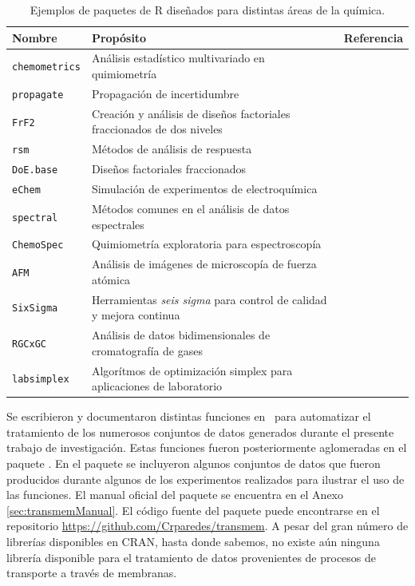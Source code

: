 \begin{table}[H]
    \centering\footnotesize
    \begin{tabular}{@{}lp{9.55cm}l@{}}\toprule
        \textbf{Nombre} & \textbf{Propósito} & \textbf{Referencia} \\\midrule
         \verb|chemometrics|&Análisis estadístico multivariado en quimiometría &\citet{Filzmoser2017}\\
         \verb|propagate|&Propagación de incertidumbre &\citet{Spiess2018}\\
         \verb|FrF2|&Creación y análisis de diseños factoriales fraccionados de dos niveles &\citet{FrF2}\\
         \verb|rsm|&Métodos de análisis de respuesta& \cite{Lenth2009}\\
         \verb|DoE.base|&Diseños factoriales fraccionados &\citet{Gromping2018}\\
         \verb|eChem|&Simulación de experimentos de electroquímica &\citet{Harvey2015}\\
         \verb|spectral|&Métodos comunes en el análisis de datos espectrales &\citet{SeilMayer2019}\\
         \verb|ChemoSpec|&Quimiometría exploratoria para espectroscopía &\citet{Hanson2020}\\
         \verb|AFM|&Análisis de imágenes de microscopía de fuerza atómica &\citet{Beauvais2019}\\
         \verb|SixSigma|&Herramientas \textit{seis sigma} para control de calidad y mejora continua &\citet{Cano2015}\\
         \verb|RGCxGC|&Análisis de datos bidimensionales de cromatografía de gases&\cite{Quiroz2020}\\
         \verb|labsimplex|&Algorítmos de optimización simplex para aplicaciones de laboratorio&\citet{labsimplex}\\\bottomrule
    \end{tabular}
    \caption{Ejemplos de paquetes de R diseñados para distintas áreas de la química.}
    \label{tab:Rpackages}
\end{table}

Se escribieron y documentaron distintas funciones en \R\ para automatizar el tratamiento de los numerosos conjuntos de datos generados durante el presente trabajo de investigación. Estas funciones fueron posteriormente aglomeradas en el paquete \trm. En el paquete se incluyeron algunos conjuntos de datos que fueron producidos durante algunos de los experimentos realizados para ilustrar el uso de las funciones. El manual oficial del paquete se encuentra en el Anexo \ref{sec:transmemManual}. El código fuente del paquete puede encontrarse en el repositorio \url{https://github.com/Crparedes/transmem}. A pesar del gran número de librerías disponibles en \ac{CRAN}, hasta donde sabemos, no existe aún ninguna librería disponible para el tratamiento de datos provenientes de procesos de transporte a través de membranas.

